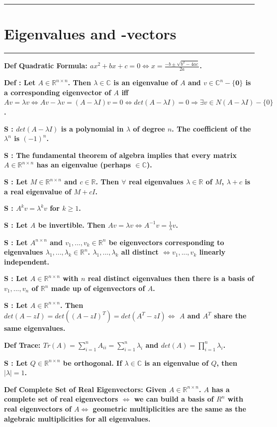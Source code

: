 \documentclass[7pt,landscape, margin = 0.1mm]{article}
\newcommand{\titellinie}{\rule{1.\linewidth}{0.75pt}}
\newcommand*{\mysection}[2][black]{\vskip 0pt \titellinie\vspace{-20pt}\section{#2}\vspace{-14pt}\titellinie \colorlet{chaptercolor}{#1}}
\newcommand{\DEF}[2]{\color{chaptercolor}\bf{Def #1}:\color{black}    \hspace{0.2cm} #2}
\newcommand{\SA}[2]{\color{chaptercolor}\bf{S #1}:\color{black}    \hspace{0.2cm} #2}
\begin{document}
\begin{multicols}{4}
\begin{flushleft}
{\mysection[Magenta]{\centering Eigenvalues and -vectors}
\DEF{Quadratic Formula}{$ax^2+bx+c=0 \Leftrightarrow x=\frac{-b\pm\sqrt{b^2-4ac}}{2a}$.}

\DEF{}{Let $A\in\mathbb{R}^{n\times n}$. Then $\lambda\in\mathbb{C}$ is an eigenvalue of $A$ and $v\in\mathbb{C}^n-\{\bm{0}\}$ is a corresponding eigenvector of $A$ iff $Av=\lambda v \Leftrightarrow Av-\lambda v = (A-\lambda I)v = 0 \Leftrightarrow det(A-\lambda I)=0 \Rightarrow \exists v\in N(A-\lambda I) - \{0\}$.}

\SA{}{$det(A-\lambda I)$ is a polynomial in $\lambda$ of degree $n$. The coefficient of the $\lambda^n$ is $(-1)^n$.}

\SA{}{The fundamental theorem of algebra implies that every matrix $A\in\mathbb{R}^{n\times n}$ has an eigenvalue (perhaps $\in\mathbb{C}$).}

\SA{}{Let $M\in\mathbb{R}^{n\times n}$ and $c\in\mathbb{R}$. Then $\forall$ real eigenvalues $\lambda\in\mathbb{R}$ of $M$, $\lambda+c$ is a real eigenvalue of $M+cI$.}

\SA{}{$A^kv=\lambda^kv$ for $k\geq1$.}

\SA{}{Let $A$ be invertible. Then $Av=\lambda v \Leftrightarrow A^{-1}v=\frac{1}{\lambda}v$.}

\SA{}{Let $A^{n\times n}$ and $v_1,...,v_k\in\mathbb{R}^n$ be eigenvectors corresponding to eigenvalues $\lambda_1,...,\lambda_k\in\mathbb{R}^n$. $\lambda_1,...,\lambda_k$ all distinct $\Leftrightarrow v_1,...,v_k$ linearly independent.}

\SA{}{Let $A\in\mathbb{R}^{n\times n}$ with $n$ real distinct eigenvalues then there is a basis of $v_1,...,v_n$ of $\mathbb{R}^n$ made up of eigenvectors of $A$.}

\SA{}{Let $A\in\mathbb{R}^{n\times n}$. Then $det(A-zI)=det((A-zI)^T)=det(A^T-zI) \Leftrightarrow$ $A$ and $A^T$ share the same eigenvalues.}

\DEF{Trace}{$Tr(A)=\sum_{i=1}^nA_{ii}=\sum_{i=1}^n\lambda_i$ and $det(A)=\prod_{i=1}^n\lambda_i$.}

\SA{}{Let $Q\in\mathbb{R}^{n\times n}$ be orthogonal. If $\lambda\in\mathbb{C}$ is an eigenvalue of $Q$, then $|\lambda|=1$.}

\DEF{Complete Set of Real Eigenvectors}{Given $A\in\mathbb{R}^{n\times n}$. $A$ has a complete set of real eigenvectors $\Leftrightarrow$ we can build a basis of $R^n$ with real eigenvectors of $A \Leftrightarrow$ geometric multiplicities are the same as the algebraic multiplicities for all eigenvalues.}

}
\end{flushleft}
\end{multicols}
\end{document}
